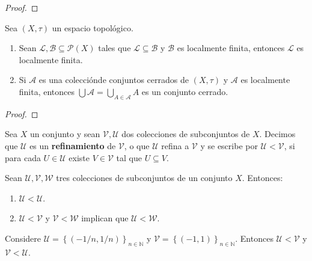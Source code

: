 \documentclass[12pt]{report}
\theoremstyle{largebreak}
\begin{document}
    \begin{proof}
    \end{proof}

    \begin{cor}
        Sea $(X,\tau)$ un espacio topológico.
        \begin{enumerate}
            \item Sean $\mathcal{L},\mathcal{B}\subseteq\mathcal{P}(X)$ tales que $\mathcal{L}\subseteq\mathcal{B}$ y $\mathcal{B}$ es localmente finita, entonces $\mathcal{L}$ es localmente finita.
            \item Si $\mathcal{A}$ es una colecciónde conjuntos cerrados de $(X,\tau)$ y $\mathcal{A}$ es localmente finita, entonces $\bigcup\mathcal{A}=\bigcup_{A\in\mathcal{A}}A$ es un conjunto cerrado.
        \end{enumerate}
    \end{cor}

    \begin{proof}
    \end{proof}

    \begin{mydef}
        Sea $X$ un conjunto y sean $\mathcal{V},\mathcal{U}$ dos colecciones de subconjuntos de $X$. Decimos que $\mathcal{U}$ es un \textbf{refinamiento} de $\mathcal{V}$, o que $\mathcal{U}$ refina a $\mathcal{V}$ y se escribe por $\mathcal{U}<\mathcal{V}$, si para cada $U\in\mathcal{U}$ existe $V\in\mathcal{V}$ tal que $U\subseteq V$.
    \end{mydef}

    \begin{obs}
        Sean $\mathcal{U},\mathcal{V},\mathcal{W}$ tres colecciones de subconjuntos de un conjunto $X$. Entonces:
        \begin{enumerate}
            \item $\mathcal{U}<\mathcal{U}$.
            \item $\mathcal{U}<\mathcal{V}$ y $\mathcal{V}<\mathcal{W}$ implican que $\mathcal{U}<\mathcal{W}$.
        \end{enumerate}
    \end{obs}

    \begin{exa}
        Considere $\mathcal{U}=\left\{(-1/n,1/n) \right\}_{ n\in\mathbb{N}}$ y $\mathcal{V}=\left\{(-1,1) \right\}_{ n\in\mathbb{N}}$. Entonces $\mathcal{U}<\mathcal{V}$ y $\mathcal{V}<\mathcal{U}$.
    \end{exa}
\end{document}
